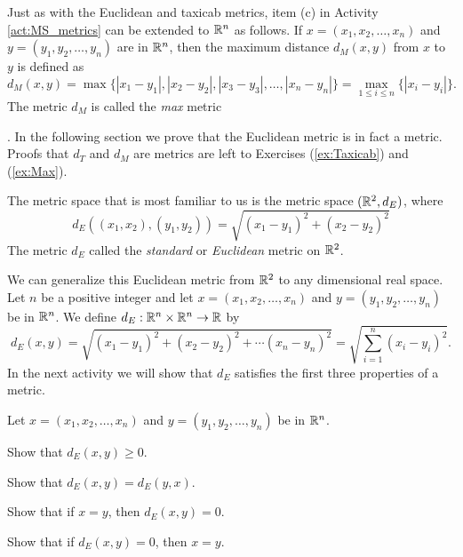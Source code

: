 Just as with the Euclidean and taxicab metrics, item (c) in Activity \ref{act:MS_metrics} can be extended to $\mathbb{R}^n$ as follows. If $x = (x_1, x_2, \ldots, x_n)$ and $y = (y_1, y_2, \ldots, y_n)$ are in $\mathbb{R}^n$, then the maximum distance $d_M(x,y)$ from $x$ to $y$ is defined as
\[d_M(x,y) = \max\{| x_1-y_1 |, | x_2-y_2 |, |x_3-y_3|, \ldots, |x_n-y_n| \} = \max_{1 \leq i \leq n} \{|x_i-y_i|\}.\]
The metric $d_M$ is called the \emph{max} metric{. In the following section we prove that the Euclidean metric is in fact a metric. Proofs that $d_T$ and $d_M$ are metrics are left to Exercises (\ref{ex:Taxicab}) and (\ref{ex:Max}). 

The metric space that is most familiar to us is the metric space $(\mathbb{R}^2, d_E)$, where 
\[d_E((x_1,x_2), (y_1,y_2)) = \sqrt{(x_1-y_1)^2 + (x_2-y_2)^2}\] 
The metric $d_E$ called the \emph{standard} or \emph{Euclidean} metric on $\mathbb{R}^2$. 

We can generalize this Euclidean metric from $\mathbb{R}^2$ to any dimensional real space. Let $n$ be a positive integer and let $x = (x_1, x_2, \ldots, x_n)$ and $y = (y_1, y_2, \ldots, y_n)$ be in $\mathbb{R}^n$. We define $d_E : \mathbb{R}^n \times \mathbb{R}^n \to \mathbb{R}$ by 
\[d_E(x,y) = \sqrt{(x_1-y_1)^2 + (x_2-y_2)^2 + \cdots (x_n-y_n)^2} = \sqrt{\sum_{i=1}^n (x_i-y_i)^2}.\]
In the next activity we will show that $d_E$ satisfies the first three properties of a metric.  

\begin{activity} Let $x = (x_1, x_2, \ldots, x_n)$ and $y = (y_1, y_2, \ldots, y_n)$ be in $\mathbb{R}^n$.
\ba
\item Show that $d_E(x,y) \geq 0$. 

\item Show that $d_E(x,y) = d_E(y,x)$.

\item Show that if $x=y$, then $d_E(x,y) = 0$.

\item Show that if $d_E(x,y) = 0$, then $x=y$. 

\ea

\end{activity}

\begin{comment}

\ActivitySolution

\ba
\item Since $(x_i-y_i)^2 \geq 0$ for each $i$, we have 
\[d_E(x,y) =  \sqrt{\sum_{i=1}^n (x_i-y_i)^2} \geq 0.\] 


\end{comment}}

